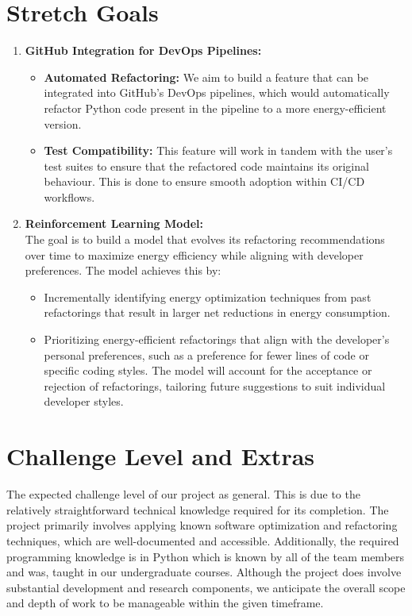 \documentclass{article}
\begin{document}
\section{Stretch Goals}

\begin{enumerate}
    \item \textbf{GitHub Integration for DevOps Pipelines:}
    \begin{itemize}
        \item \textbf{Automated Refactoring:} We aim to build a feature that can be integrated into GitHub’s DevOps pipelines, which would automatically refactor Python code present in the pipeline to a more energy-efficient version.
        \item \textbf{Test Compatibility:} This feature will work in tandem with the user's test suites to ensure that the refactored code maintains its original behaviour. This is done to ensure smooth adoption within CI/CD workflows.
    \end{itemize}

    \item \textbf{Reinforcement Learning Model:} \\
    The goal is to build a model that evolves its refactoring recommendations over time to maximize energy efficiency while aligning with developer preferences. The model achieves this by:
    \begin{itemize}
        \item Incrementally identifying energy optimization techniques from past refactorings that result in larger net reductions in energy consumption.
        \item Prioritizing energy-efficient refactorings that align with the developer's personal preferences, such as a preference for fewer lines of code or specific coding styles. The model will account for the acceptance or rejection of refactorings, tailoring future suggestions to suit individual developer styles.
    \end{itemize}
\end{enumerate}


\section{Challenge Level and Extras}

The expected challenge level of our project as general. This is due to the
relatively straightforward technical knowledge required for its completion.
The project primarily involves applying known software optimization and
refactoring techniques, which are well-documented and accessible.
Additionally, the required programming knowledge is in Python which is known
by all of the team members and was, taught in our undergraduate courses.
Although the project does involve substantial development and research components,
we anticipate the overall scope and depth of work to be manageable within the
given timeframe. \\
\end{document}

